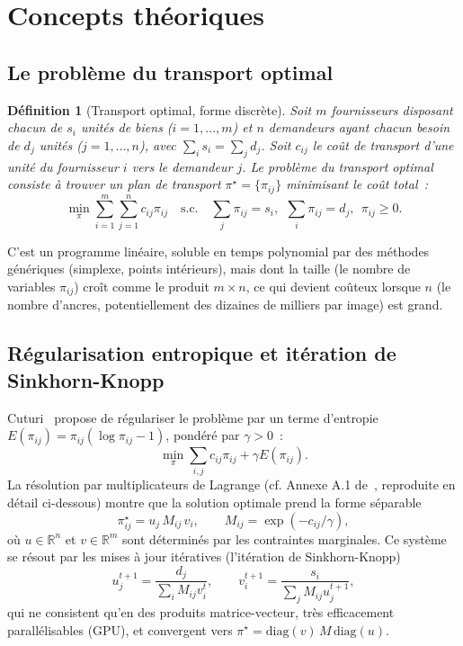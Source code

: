 \documentclass[11pt,a4paper]{article}
\newtheorem{definition}{Définition}
\begin{document}
\section{Concepts théoriques}
\label{sec:fondements}

\subsection{Le problème du transport optimal}
\begin{definition}[Transport optimal, forme discrète]
Soit $m$ fournisseurs disposant chacun de $s_i$ unités de biens ($i=1,\dots,m$) et $n$ demandeurs ayant chacun besoin de $d_j$ unités ($j=1,\dots,n$), avec $\sum_i s_i = \sum_j d_j$. Soit $c_{ij}$ le coût de transport d'une unité du fournisseur $i$ vers le demandeur $j$. Le problème du transport optimal~\cite{villani2009optimal} consiste à trouver un plan de transport $\pi^\star = \{\pi_{ij}\}$ minimisant le coût total~:
\[
  \min_\pi \sum_{i=1}^m \sum_{j=1}^n c_{ij}\pi_{ij}
  \quad\text{s.c.}\quad
  \sum_j \pi_{ij} = s_i,\ \ \sum_i \pi_{ij} = d_j,\ \ \pi_{ij}\ge 0.
\]
\end{definition}
C'est un programme linéaire, soluble en temps polynomial par des méthodes génériques (simplexe, points intérieurs), mais dont la taille (le nombre de variables $\pi_{ij}$) croît comme le produit $m\times n$, ce qui devient coûteux lorsque $n$ (le nombre d'ancres, potentiellement des dizaines de milliers par image) est grand.

\subsection{Régularisation entropique et itération de Sinkhorn-Knopp}
Cuturi~\cite{cuturi2013sinkhorn} propose de régulariser le problème par un terme d'entropie $E(\pi_{ij}) = \pi_{ij}(\log\pi_{ij}-1)$, pondéré par $\gamma>0$~:
\[
  \min_\pi \sum_{i,j} c_{ij}\pi_{ij} + \gamma E(\pi_{ij}).
\]
La résolution par multiplicateurs de Lagrange (cf. Annexe A.1 de~\cite{ge2021ota}, reproduite en détail ci-dessous) montre que la solution optimale prend la forme séparable
\[
  \pi^\star_{ij} = u_j\, M_{ij}\, v_i, \qquad M_{ij} = \exp(-c_{ij}/\gamma),
\]
où $u\in\mathbb{R}^n$ et $v\in\mathbb{R}^m$ sont déterminés par les contraintes marginales. Ce système se résout par les mises à jour itératives (l'itération de Sinkhorn-Knopp)
\[
  u_j^{t+1} = \frac{d_j}{\sum_i M_{ij} v_i^t}, \qquad
  v_i^{t+1} = \frac{s_i}{\sum_j M_{ij} u_j^{t+1}},
\]
qui ne consistent qu'en des produits matrice-vecteur, très efficacement parallélisables (GPU), et convergent vers $\pi^\star = \mathrm{diag}(v)\,M\,\mathrm{diag}(u)$.
\end{document}
